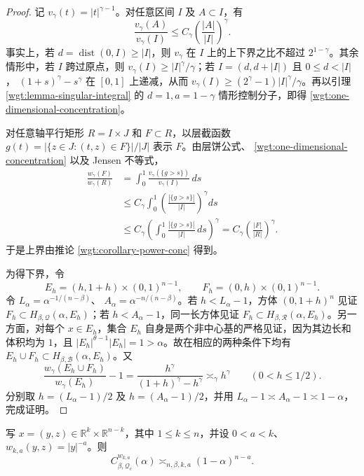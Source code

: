 \begin{proof}
记 \(v_\gamma(t)=|t|^{\gamma-1}\)。对任意区间 \(I\) 及 \(A\subset I\)，有
\begin{equation}
 \frac{v_\gamma(A)}{v_\gamma(I)}\leq C_\gamma
 \left(\frac{|A|}{|I|}\right)^\gamma.
\label{wgt:one-dimensional-concentration}
\end{equation}
事实上，若 \(d=\operatorname{dist}(0,I)\geq |I|\)，则 \(v_\gamma\) 在 \(I\) 上的上下界之比不超过
\(2^{1-\gamma}\)。其余情形中，若 \(I\) 跨过原点，则
\(v_\gamma(I)\geq|I|^\gamma/\gamma\)；若 \(I=(d,d+|I|)\) 且 \(0\leq d<|I|\)，
\((1+s)^\gamma-s^\gamma\) 在 \([0,1]\) 上递减，从而
\(v_\gamma(I)\geq(2^\gamma-1)|I|^\gamma/\gamma\)。再以引理
\ref{wgt:lemma-singular-integral} 的 \(d=1,a=1-\gamma\) 情形控制分子，即得
\eqref{wgt:one-dimensional-concentration}。

对任意轴平行矩形 \(R=I\times J\) 和 \(F\subset R\)，以层截函数
\(g(t)=|\{z\in J:(t,z)\in F\}|/|J|\) 表示 \(F\)。由层饼公式、
\eqref{wgt:one-dimensional-concentration} 以及 Jensen 不等式，
\begin{align*}
 \frac{w_\gamma(F)}{w_\gamma(R)}
 &=\int_0^1\frac{v_\gamma(\{g>s\})}{v_\gamma(I)}\,ds\\
 &\leq C_\gamma\int_0^1\left(\frac{|\{g>s\}|}{|I|}\right)^\gamma ds\\
 &\leq C_\gamma\left(\int_0^1\frac{|\{g>s\}|}{|I|}\,ds\right)^\gamma
 =C_\gamma\left(\frac{|F|}{|R|}\right)^\gamma.
\end{align*}
于是上界由推论 \ref{wgt:corollary-power-conc} 得到。

为得下界，令
\[
 E_h=(h,1+h)\times(0,1)^{n-1},\qquad
 F_h=(0,h)\times(0,1)^{n-1}.
\]
令 \(L_\alpha=\alpha^{-1/(n-\beta)}\)、
\(A_\alpha=\alpha^{-n/(n-\beta)}\)。若 \(h<L_\alpha-1\)，方体
\((0,1+h)^n\) 见证 \(F_h\subset H_{\beta,\mathcal Q}(\alpha,E_h)\)；若
\(h<A_\alpha-1\)，同一长方体见证
\(F_h\subset H_{\beta,\mathcal R}(\alpha,E_h)\)。另一方面，对每个 \(x\in E_h\)，集合
\(E_h\) 自身是两个非中心基的严格见证，因为其边长和体积均为 \(1\)，且
\(|E_h|^{\theta-1}|E_h|=1>\alpha\)。故在相应的两种条件下均有
\(E_h\cup F_h\subset H_{\beta,\mathcal B}(\alpha,E_h)\)。又
\[
 \frac{w_\gamma(E_h\cup F_h)}{w_\gamma(E_h)}-1
 =\frac{h^\gamma}{(1+h)^\gamma-h^\gamma}\asymp_\gamma h^\gamma
 \qquad(0<h\leq1/2).
\]
分别取 \(h=(L_\alpha-1)/2\) 及 \(h=(A_\alpha-1)/2\)，并用
\(L_\alpha-1\asymp A_\alpha-1\asymp1-\alpha\)，完成证明。
\end{proof}

\begin{proposition}[横向径向奇性权的中心阶]\label{wgt:proposition-radial}
写 \(x=(y,z)\in\mathbb R^k\times\mathbb R^{n-k}\)，其中 \(1\leq k\leq n\)，并设
\(0<a<k\)、\(w_{k,a}(y,z)=|y|^{-a}\)。则
\begin{equation}
 C^{w_{k,a}}_{\beta,\mathcal Q_c}(\alpha)
 \asymp_{n,\beta,k,a}(1-\alpha)^{n-a}.
\label{wgt:radial}
\end{equation}
\end{proposition}

